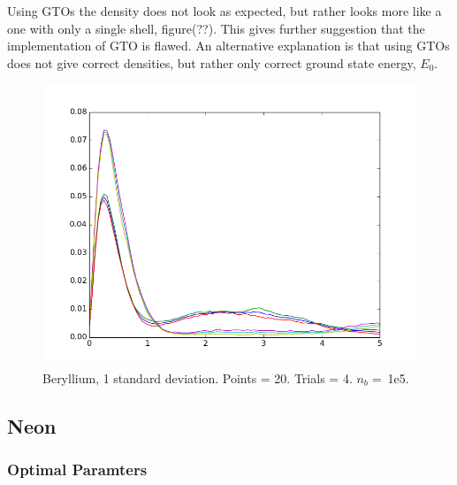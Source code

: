 \documentclass[twocolumn,fleqn,8pt]{article}  %
\begin{document}
Using GTOs the density does not look as expected, but rather
looks more like a one with only a single shell, figure(??). This gives further suggestion that 
the implementation of GTO is flawed. An alternative explanation is that using
GTOs does not give correct densities, but rather only correct ground state energy, $E_0$.

\begin{figure}
	\includegraphics[width=\columnwidth]{../res/plot/beryllium_03/beryllium_03.png}
	\caption{Beryllium, 1 standard deviation. 
	Points = 20. Trials = 4.	$n_b = \:$1e5.}
	\label{fig:beyllium_03}
\end{figure}

\subsection{Neon}
\subsubsection{Optimal Paramters}
\end{document}
